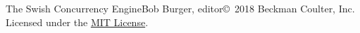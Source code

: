 \documentclass[letterpaper,11pt,twoside,final]{report}
\begin{document}
\begin{sagianbook}{The Swish Concurrency Engine}{Bob Burger,
    editor}{\copyright\ 2018 Beckman Coulter, Inc.
    Licensed under the \href{https://opensource.org/licenses/MIT}{MIT License}.}



\end{sagianbook}
\end{document}
